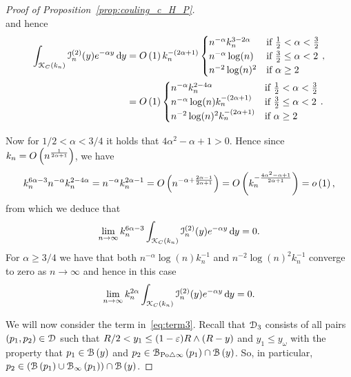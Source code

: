 \begin{proof}[Proof of Proposition~\ref{prop:couling_c_H_P}]
\[\]
and hence
\begin{align*}
	\int_{{\mathcal K}_{C}(k_n)} \mathcal{I}_n^{(2)}(y) e^{-\alpha y} \operatorname{\mathrm{d}\hspace{-2pt}} y
	&= O\left(1\right) k_n^{-(2\alpha + 1)}\begin{cases}
				n^{-\alpha} k_n^{3 - 2\alpha} &\mbox{if } \frac{1}{2} < \alpha < \frac{3}{2}\\
				n^{-\alpha} \log(n) &\mbox{if } \frac{3}{2} \le \alpha < 2\\
				n^{-2} \log(n)^{2} &\mbox{if } \alpha \ge 2
		\end{cases},	\\
	&= O\left(1\right) \begin{cases}
				n^{-\alpha} k_n^{2 - 4\alpha} &\mbox{if } \frac{1}{2} < \alpha < \frac{3}{2}\\
				n^{-\alpha} \log(n)k_n^{-(2\alpha + 1)} &\mbox{if } \frac{3}{2} \le \alpha < 2\\
				n^{-2} \log(n)^{2} k_n^{-(2\alpha + 1)} &\mbox{if } \alpha \ge 2
		\end{cases}.
\end{align*}

Now for $1/2 < \alpha < 3/4$ it holds that $4\alpha^2 - \alpha + 1 > 0$. Hence since $k_n = O\left(n^{\frac{1}{2\alpha + 1}}\right)$, we have
\[
	k_n^{6\alpha - 3} n^{-\alpha} k_n^{2 - 4\alpha} = n^{-\alpha} k_n^{2\alpha - 1} = O\left(n^{-\alpha + \frac{2\alpha - 1}{2\alpha + 1}}\right) = O\left(k_n^{-\frac{4\alpha^2 - \alpha + 1}{2\alpha + 1}}\right) = o\left(1\right),
\]
from which we deduce that
\[
	\lim_{n \to \infty} k_n^{6\alpha - 3} \int_{{\mathcal K}_{C}(k_n)} \mathcal{I}_n^{(2)}(y)
	e^{-\alpha y} \operatorname{\mathrm{d}\hspace{-2pt}} y = 0.
\]
For $\alpha \ge 3/4$ we have that both $n^{-\alpha} \log(n) k_n^{-1}$ and $n^{-2} \log(n)^2 k_n^{-1}$ converge to zero as $n \to \infty$ and hence in this case
\[
	\lim_{n \to \infty} k_n^{2\alpha} \int_{{\mathcal K}_{C}(k_n)} \mathcal{I}_n^{(2)}(y)
	e^{-\alpha y} \operatorname{\mathrm{d}\hspace{-2pt}} y = 0.
\]

We will now consider the term in~\eqref{eq:term3}. 
Recall that $\mathcal{D}_{3}$ consists of all pairs $(p_1, p_2 ) \in \mathcal{D}_{}$ such that $R/2 < y_1 \leq (1-\varepsilon)R \wedge (R-y)$ and $y_1 \leq y_\omega$ with the property that 
$p_1 \in {\mathcal B}\left(y\right)$ and $p_2 \in {\mathcal B}_{{\mathrm{Po}} \bigtriangleup \infty}\left(p_1\right) \cap {\mathcal B}\left(y\right)$.    
So, in particular, $p_2 \in ({\mathcal B}\left(p_1\right) \cup {\mathcal B}_{\infty}\left(p_1\right)) \cap {\mathcal B}\left(y\right)$.


\end{proof}
